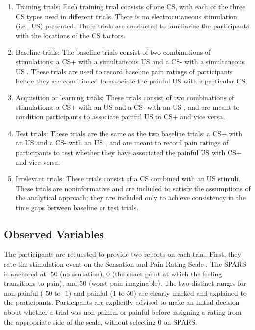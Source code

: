 \documentclass{article}
\begin{document}
  \begin{enumerate}

  \item Training trials: Each training trial consists of one CS, with each of the three CS types used in different trials. There is no electrocutaneous stimulation (i.e., US) presented. These trials are conducted to familiarize the participants with the locations of the CS tactors. 


  \item Baseline trials: The baseline trials consist of two combinations of stimulations: a CS+ with a simultaneous US  and a CS- with a simultaneous US  . These trials are used to record baseline pain ratings of participants before they are conditioned to associate the painful US with a particular CS. 


  \item Acquisition or learning trials: These trials consist of two combinations of stimulations: a CS+ with an US  and a CS- with an US  , and are meant to condition participants to associate painful US to CS+ and vice versa. 


  \item Test trials: These trials are the same as the two baseline trials: a CS+ with an US  and a CS- with an US  , and are meant to record pain ratings of participants to test whether they have associated the painful US with CS+ and vice versa. 


  \item Irrelevant trials: These trials consist of a CS  combined with an US  stimuli. These trials are noninformative and are included to satisfy the assumptions of the analytical approach; they are included only to achieve consistency in the time gaps between baseline or test trials. 


  

\end{enumerate}
\subsection{Observed Variables} 

The participants are requested to provide two reports on each trial. First, they rate the stimulation event on the Sensation and Pain Rating Scale \autocite{bib44,bib40} . The SPARS is anchored at -50 (no sensation), 0 (the exact point at which the feeling transitions to pain), and 50 (worst pain imaginable). The two distinct ranges for non-painful (-50 to -1) and painful (1 to 50) are clearly marked and explained to the participants. Participants are explicitly advised to make an initial decision about whether a trial was non-painful or painful before assigning a rating from the appropriate side of the scale, without selecting 0 on SPARS. 
\end{document}
